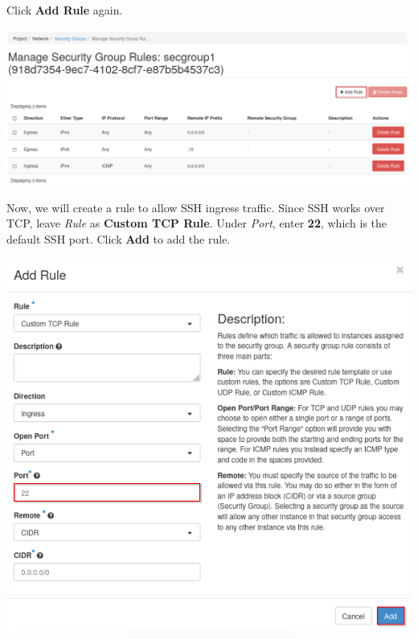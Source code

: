 \documentclass[letterpaper, 12pt]{article}
\begin{document}
\begin{enumerate}
    \begin{labstep}
        Click \textbf{Add Rule} again.

        \begin{center}
            \includegraphics[width=\linewidth]{images/part1/step8.png}
        \end{center}
    \end{labstep}

    \begin{labstep}
        Now, we will create a rule to allow SSH ingress traffic.
        Since SSH works over TCP, leave \textit{Rule} as \textbf{Custom TCP Rule}.
        Under \textit{Port}, enter \textbf{22}, which is the default SSH port.
        Click \textbf{Add} to add the rule.

        \begin{center}
            \includegraphics[width=\linewidth]{images/part1/step9.png}
        \end{center}
    \end{labstep}


\end{enumerate}
\end{document}
